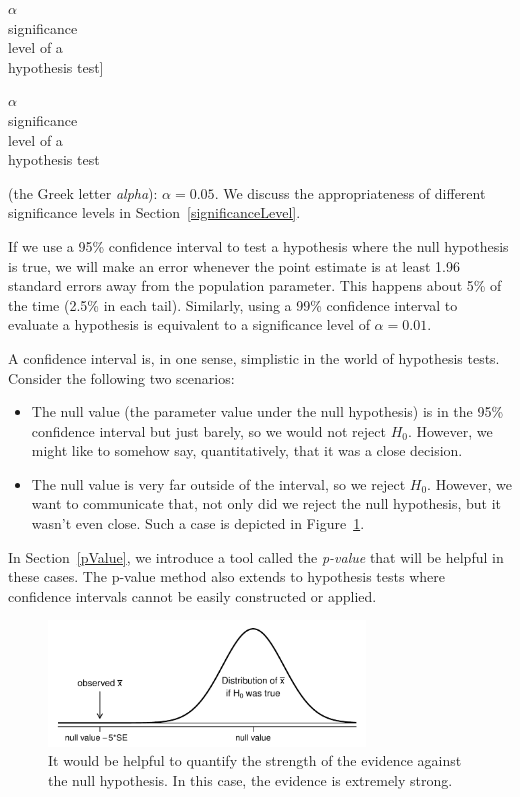 $\alpha$\\\footnotesize significance\\level of a\\hypothesis test]{\raggedright\vspace{-4mm}

$\alpha$\\\footnotesize significance\\level of a\\hypothesis test} (the Greek letter \emph{alpha}): $\alpha = 0.05$. We discuss the appropriateness of different significance levels in Section~\ref{significanceLevel}.

If we use a 95\% confidence interval to test a hypothesis where the null hypothesis is true, we will make an error whenever the point estimate is at least 1.96 standard errors away from the population parameter. This happens about 5\% of the time (2.5\% in each tail). Similarly, using a 99\% confidence interval to evaluate a hypothesis is equivalent to a significance level of $\alpha = 0.01$.

A confidence interval is, in one sense, simplistic in the world of hypothesis tests. Consider the following two scenarios:
\begin{itemize}
\setlength{\itemsep}{0mm}
\item The null value (the parameter value under the null hypothesis) is in the 95\% confidence interval but just barely, so we would not reject $H_0$. However, we might like to somehow say, quantitatively, that it was a close decision.
\item The null value is very far outside of the interval, so we reject $H_0$. However, we want to communicate that, not only did we reject the null hypothesis, but it wasn't even close. Such a case is depicted in Figure~\ref{whyWeWantPValue}.
\end{itemize}
In Section~\ref{pValue}, we introduce a tool called the \emph{p-value} that will be helpful in these cases. The p-value method also extends to hypothesis tests where confidence intervals cannot be easily constructed or applied.

\begin{figure}[hht]
\centering
\includegraphics[width=0.75\textwidth]{04/figures/whyWeWantPValue/whyWeWantPValue}
\caption{It would be helpful to quantify the strength of the evidence against the null hypothesis. In this case, the evidence is extremely strong.}
\label{whyWeWantPValue}
\end{figure}


